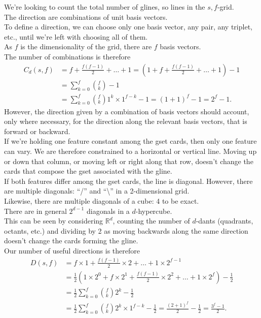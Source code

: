 \documentclass{article}
\theoremstyle{definition}
\theoremstyle{remark}
\begin{document}
We're looking to count the total number of glines, so lines in the $s,f$-grid.\\
The direction are combinations of unit basis vectors.\\
To define a direction, we can choose only one basis vector, any pair, any triplet, etc., until we're left with choosing all of them.\\
As $f$ is the dimensionality of the grid, there are $f$ basis vectors.\\
The number of combinations is therefore
\begin{align}
    C_d(s,f)&=f+\frac{f(f-1)}{2}+\dotsc+1=\left(1+f+\frac{f(f-1)}{2}+\dotsc+1\right)-1\nonumber\\
    &=\sum_{k=0}^f \binom{f}{k}-1\nonumber\\
    &=\sum_{k=0}^f \binom{f}{k}1^k \times1^{f-k}-1=(1+1)^f-1=2^f-1.
\end{align}
However, the direction given by a combination of basis vectors should account, only where necessary, for the direction along the relevant basis vectors, that is forward or backward.\\
If we're holding one feature constant among the gset cards, then only one feature can vary. We are therefore constrained to a horizontal or vertical line. Moving up or down that column, or moving left or right along that row, doesn't change the cards that compose the gset associated with the gline.\\
If both features differ among the gset cards, the line is diagonal. However, there are multiple diagonals: ``/'' and ``\textbackslash'' in a 2-dimensional grid.\\ 
Likewise, there are multiple diagonals of a cube: 4 to be exact.\\
There are in general $2^{d-1}$ diagonals in a $d$-hypercube.\\
This can be seen by considering $\mathbb{R}^d$, counting the number of $d$-dants (quadrants, octants, etc.) and dividing by 2 as moving backwards along the same direction doesn't change the cards forming the gline.\\
Our number of useful directions is therefore
\begin{align}
\label{eqn:dirs}
    D(s,f)&=f\times1+\frac{f(f-1)}{2}\times2+\dotsc+1\times2^{f-1}\nonumber\\
    &=\frac{1}{2}\left(1\times2^0+f\times2^1+\frac{f(f-1)}{2}\times2^2+\dotsc+1\times2^{f}\right)-\frac{1}{2}\nonumber\\
    &=\frac{1}{2}\sum_{k=0}^f \binom{f}{k}2^k-\frac{1}{2}\nonumber\\
    &=\frac{1}{2}\sum_{k=0}^f \binom{f}{k}2^k \times1^{f-k}-\frac{1}{2}=\frac{(2+1)^f}{2}-\frac{1}{2}=\frac{3^f-1}{2}.
\end{align}
\end{document}
